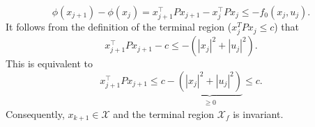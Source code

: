 \documentclass[12pt,pdftex,a4paper]{scrartcl}
\begin{document}
\begin{enumerate}
\begin{compactenum}[1.]
   \begin{equation*}
       \phi(x_{j+1})-\phi(x_j) = x_{j+1}^\top P x_{j+1} - x_j^\top P x_j \leq -f_0(x_j,u_j).
   \end{equation*}
   It follows from the definition of the terminal region ($x_j^T P x_j \leq c$) that 
   \begin{equation*}
       x_{j+1}^\top P x_{j+1} - c \leq -(|x_j|^2 + |u_j|^2).
   \end{equation*}
   This is equivalent to 
   \begin{equation*}
       x_{j+1}^\top P x_{j+1} \leq c - \underbrace{(|x_j|^2 + |u_j|^2)}_{\substack{\geq 0}} \leq c.
   \end{equation*}
   Consequently, $x_{k+1} \in \mathcal{X}$ and the terminal region $\mathcal{X}_f$ is invariant.
   \end{compactenum}


\end{enumerate}
\end{document}
